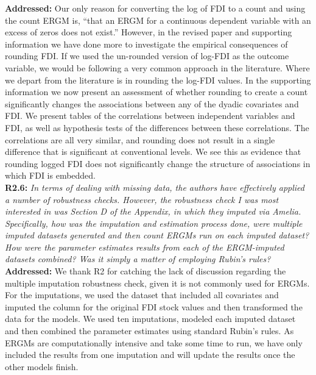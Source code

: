 \documentclass[a4paper,11pt]{texMemo}
\begin{document}
\noindent \textbf{Addressed:} Our only reason for converting the log of FDI to a count and using the count ERGM is, ``that an ERGM for a continuous dependent variable with an excess of zeros does not exist.'' However, in the revised paper and supporting information we have done more to investigate the empirical consequences of rounding FDI. If we used the un-rounded version of log-FDI as the outcome variable, we would be following a very common approach in the literature. Where we depart from the literature is in rounding the log-FDI values. In the supporting information we now present an assessment of whether rounding to create a count significantly changes the associations between any of the dyadic covariates and FDI. We present tables of the correlations between independent variables and FDI, as well as hypothesis tests of the differences between these correlations. The correlations are all very similar, and rounding does not result in a single difference that is significant at conventional levels. We see this as evidence that rounding logged FDI does not significantly change the structure of associations in which FDI is embedded. \\

\noindent \textbf{R2.6:} \emph{In terms of dealing with missing data, the authors have effectively applied a number of robustness checks. However, the robustness check I was most interested in was Section D of the Appendix, in which they imputed via Amelia. Specifically, how was the imputation and estimation process done, were multiple imputed datasets generated and then count ERGMs run on each imputed dataset? How were the parameter estimates results from each of the ERGM-imputed datasets combined? Was it simply a matter of employing Rubin's rules?}\\

\noindent \textbf{Addressed:} We thank R2 for catching the lack of discussion regarding the multiple imputation robustness check, given it is not commonly used for ERGMs. For the imputations, we used the dataset that included all covariates and imputed the column for the original FDI stock values and then transformed the data for the models. We used ten imputations, modeled each imputed dataset and then combined the parameter estimates using standard Rubin's rules. As ERGMs are computationally intensive and take some time to run, we have only included the results from one imputation and will update the results once the other models finish.\\
\end{document}
